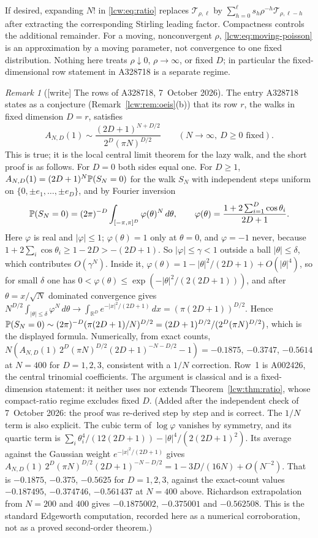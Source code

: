\documentclass[11pt,letterpaper]{article}
\theoremstyle{remark}\newtheorem{remark}[theorem]{Remark}
\newcommand{\TT}{\mathcal T}\newcommand{\PP}{\mathcal P}
\begin{document}
If desired, expanding $N!$ in \eqref{lcw:eq:ratio} replaces $\TT_{\rho,\ell}$ by $\sum_{h=0}^\ell s_h\rho^{-h}\TT_{\rho,\ell-h}$ after extracting the corresponding Stirling leading factor. Compactness controls the additional remainder. For a moving, nonconvergent $\rho$, \eqref{lcw:eq:moving-poisson} is an approximation by a moving parameter, not convergence to one fixed distribution. Nothing here treats $\rho\downarrow0$, $\rho\to\infty$, or fixed $D$; in particular the fixed-dimensional row statement in A328718 is a separate regime.

\begin{remark}[{[write]} The rows of A328718, 7~October 2026]\label{lcw:rem:rows}
The entry A328718 states as a conjecture (Remark~\ref{lcw:rem:oeis}(b)) that its
row $r$, the walks in fixed dimension $D=r$, satisfies
\[
 A_{N,D}(1)\sim\frac{(2D+1)^{N+D/2}}{2^D(\pi N)^{D/2}}
 \qquad(N\to\infty,\ D\ge0\text{ fixed}).
\]
This is true; it is the local central limit theorem for the lazy walk, and
the short proof is as follows. For $D=0$ both sides equal one. For $D\ge1$,
$A_{N,D}(1)=(2D+1)^N\mathbb P(S_N=0)$ for the walk $S_N$ with independent steps
uniform on $\{0,\pm e_1,\dots,\pm e_D\}$, and by Fourier inversion
\[
 \mathbb P(S_N=0)=(2\pi)^{-D}\int_{[-\pi,\pi]^D}\varphi(\theta)^N\,d\theta,\qquad
 \varphi(\theta)=\frac{1+2\sum_{i=1}^D\cos\theta_i}{2D+1}.
\]
Here $\varphi$ is real and $|\varphi|\le1$; $\varphi(\theta)=1$ only at
$\theta=0$, and $\varphi=-1$ never, because $1+2\sum_i\cos\theta_i\ge1-2D>-(2D+1)$.
So $|\varphi|\le\gamma<1$ outside a ball $|\theta|\le\delta$, which contributes
$O(\gamma^N)$. Inside it, $\varphi(\theta)=1-|\theta|^2/(2D+1)+O(|\theta|^4)$, so
for small $\delta$ one has $0<\varphi(\theta)\le\exp(-|\theta|^2/(2(2D+1)))$, and
after $\theta=x/\sqrt N$ dominated convergence gives
$N^{D/2}\int_{|\theta|\le\delta}\varphi^N\,d\theta\to\int_{\mathbb R^D}e^{-|x|^2/(2D+1)}\,dx=(\pi(2D+1))^{D/2}$.
Hence $\mathbb P(S_N=0)\sim(2\pi)^{-D}(\pi(2D+1)/N)^{D/2}=(2D+1)^{D/2}/(2^D(\pi N)^{D/2})$,
which is the displayed formula. Numerically, from exact counts,
$N(A_{N,D}(1)\,2^D(\pi N)^{D/2}(2D+1)^{-N-D/2}-1)=-0.1875$, $-0.3747$, $-0.5614$
at $N=400$ for $D=1,2,3$, consistent with a $1/N$ correction. Row~1 is
A002426, the central trinomial coefficients. The argument is classical and
is a fixed-dimension statement: it neither uses nor extends
Theorem~\ref{lcw:thm:ratio}, whose compact-ratio regime excludes fixed $D$.
\textup{(Added after the independent check of 7~October 2026: the proof was
re-derived step by step and is correct. The $1/N$ term is also explicit. The
cubic term of $\log\varphi$ vanishes by symmetry, and its quartic term is
$\sum_i\theta_i^4/(12(2D+1))-|\theta|^4/(2(2D+1)^2)$. Its average against the
Gaussian weight $e^{-|x|^2/(2D+1)}$ gives
$A_{N,D}(1)\,2^D(\pi N)^{D/2}(2D+1)^{-N-D/2}=1-3D/(16N)+O(N^{-2})$. That is
$-0.1875$, $-0.375$, $-0.5625$ for $D=1,2,3$, against the exact-count values
$-0.187495$, $-0.374746$, $-0.561437$ at $N=400$ above. Richardson
extrapolation from $N=200$ and $400$ gives $-0.1875002$, $-0.375001$ and
$-0.562508$. This is the standard
Edgeworth computation, recorded here as a numerical corroboration, not as a
proved second-order theorem.)}
\end{remark}
\end{document}

